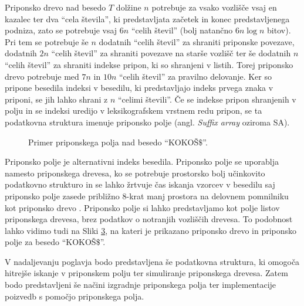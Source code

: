 Priponsko drevo nad besedo $T$ dolžine $n$ potrebuje za vsako vozlišče vsaj en kazalec ter dva \enquote{cela števila}, ki predstavljata začetek in konec predstavljenega podniza, zato se potrebuje vsaj $6n$ \enquote{celih števil} (bolj natančno $6n\log{n}$ bitov). Pri tem se potrebuje še $n$ dodatnih \enquote{celih števil} za shraniti priponske povezave, dodatnih $2n$ \enquote{celih števil} za shraniti povezave na starše vozlišč ter še dodatnih $n$ \enquote{celih števil} za shraniti indekse pripon, ki so shranjeni v listih. Torej priponsko drevo potrebuje med $7n$ in $10n$ \enquote{celih števil} za pravilno delovanje. Ker so pripone besedila indeksi v besedilu, ki predstavljajo indeks prvega znaka v priponi, se jih lahko shrani z $n$ \enquote{celimi števili}. Če se indekse pripon shranjenih v polju in se indeksi uredijo v leksikografskem vrstnem redu pripon, se ta podatkovna struktura imenuje priponsko polje (angl. \textit{Suffix array} oziroma SA).

\begin{figure}[htb]
    \begin{subfigure}[t]{\linewidth}
        
        
        \centering
        \subcaption*{}
        \label{fig:aSADrevo}
    \end{subfigure}
    \begin{subfigure}[t]{1\linewidth}        
        
        \centering
        \subcaption*{}
        \label{fig:aSAPolje}
    \end{subfigure}
    \caption{Primer priponskega polja nad besedo \enquote{KOKOŠ$\$$}.} 
    \label{fig:SuffuxArray}
\end{figure}

Priponsko polje je alternativni indeks besedila. Priponsko polje se uporablja namesto priponskega drevesa, ko se potrebuje prostorsko bolj učinkovito podatkovno strukturo in se lahko žrtvuje čas iskanja vzorcev v besedilu saj priponsko polje zasede približno 8-krat manj prostora na delovnem pomnilniku kot priponsko drevo \cite{Manber1990}. Priponsko polje si lahko predstavljamo kot polje listov priponskega drevesa, brez podatkov o notranjih vozliščih drevesa. To podobnost lahko vidimo tudi na Sliki \ref{fig:SuffuxArray}, na kateri je prikazano priponsko drevo in priponsko polje za besedo \enquote{KOKOŠ$\$$}.

V nadaljevanju poglavja bodo predstavljena še podatkovna struktura, ki omogoča hitrejše iskanje v priponskem polju ter simuliranje priponskega drevesa. Zatem bodo predstavljeni še načini izgradnje priponskega polja ter implementacije poizvedb s pomočjo priponskega polja.

